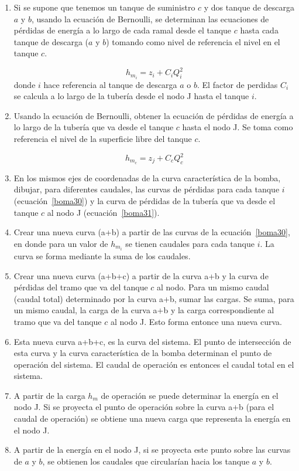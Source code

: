 \documentclass[11pt, oneside]{article}
\begin{document}
\begin{enumerate}
\item Si se supone que tenemos un tanque de suministro $c$ y dos tanque de descarga $a$ y $b$, usando la ecuaci\'on de Bernoulli, se determinan las ecuaciones de p\'erdidas de energ\'ia a lo largo de cada ramal desde el tanque $c$ hasta cada tanque de descarga ($a$ y $b$) tomando como nivel de referencia el nivel en el tanque $c$.

\begin{equation}
h_{m_i} = z_{i} + C_i Q_i^2 
\label{boma30}
\end{equation}
donde $i$ hace referencia al tanque de descarga $a$ o $b$. El factor de perdidas $C_i$ se calcula a lo largo de la tuber\'ia desde el nodo J hasta el tanque $i$.
\item Usando la ecuaci\'on de Bernoulli, obtener la ecuaci\'on de p\'erdidas de energ\'ia a lo largo de la tuber\'ia que va desde el tanque $c$ hasta el nodo J. Se toma como referencia el nivel de la superficie libre del tanque $c$. 

\begin{equation}
h_{m_c} = z_{j} + C_c Q_c^2 
\label{boma31}
\end{equation}

\item En los mismos ejes de coordenadas de la curva caracter\'istica de la bomba, dibujar, para diferentes caudales, las curvas de p\'erdidas para cada tanque $i$ (ecuaci\'on~\ref{boma30}) y la curva de p\'erdidas de la tuber\'ia que va desde el tanque $c$ al nodo J (ecuaci\'on~\ref{boma31}).
\item Crear una nueva curva (a+b) a partir de las curvas de la ecuaci\'on~\ref{boma30}, en donde para un valor de $h_{m_i}$ se tienen caudales para cada tanque $i$. La curva se forma mediante la suma de los caudales.
\item Crear una nueva curva (a+b+c) a partir de la curva a+b y la curva de p\'erdidas del tramo que va del tanque $c$ al nodo. Para un mismo caudal (caudal total) determinado por la curva a+b, sumar las cargas. Se suma, para un mismo caudal, la carga de la curva a+b y la carga correspondiente al tramo que va del tanque $c$ al nodo J. Esto forma entonce una nueva curva. 
\item Esta nueva curva a+b+c, es la curva del sistema. El punto de intersecci\'on de esta curva y la curva caracter\'istica de la bomba determinan el punto de operaci\'on del sistema. El caudal de operaci\'on es entonces el caudal total en el sistema. 
\item A partir de la carga  $h_m$ de operaci\'on se puede determinar la energ\'ia en el nodo J. Si se proyecta el punto de operaci\'on sobre la curva a+b (para el caudal de operaci\'on) se obtiene una nueva carga que representa la energ\'ia en el nodo J. 
\item A partir de la energ\'ia en el nodo J, si se proyecta este punto sobre las curvas de $a$ y $b$, se obtienen los caudales que circular\'ian hacia los tanque $a$ y $b$.
\end{enumerate}






\end{document}

